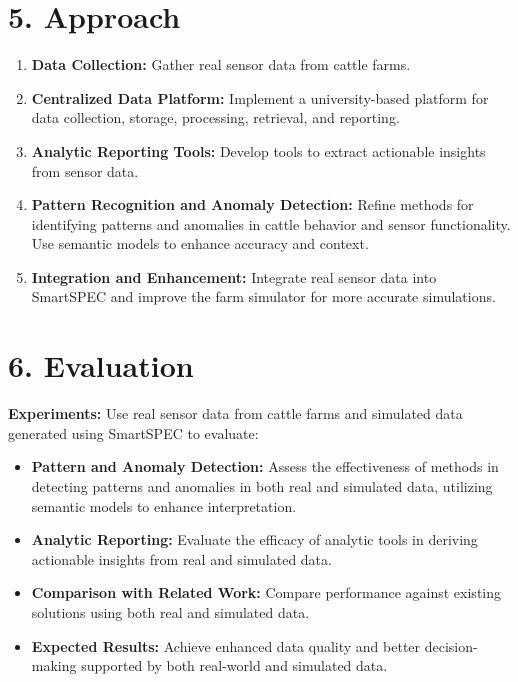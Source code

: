 \documentclass[11pt]{article}
\begin{document}
\section*{5. Approach}
\begin{enumerate}[label=\arabic*., wide=0pt, left=0pt]
    \item \textbf{Data Collection:} Gather real sensor data from cattle farms.
    \item \textbf{Centralized Data Platform:} Implement a university-based platform for data collection, storage, processing, retrieval, and reporting.
    \item \textbf{Analytic Reporting Tools:} Develop tools to extract actionable insights from sensor data.
    \item \textbf{Pattern Recognition and Anomaly Detection:} Refine methods for identifying patterns and anomalies in cattle behavior and sensor functionality. Use semantic models to enhance accuracy and context.
    \item \textbf{Integration and Enhancement:} Integrate real sensor data into SmartSPEC and improve the farm simulator for more accurate simulations.
\end{enumerate}

\section*{6. Evaluation}
\textbf{Experiments:} Use real sensor data from cattle farms and simulated data generated using SmartSPEC to evaluate:
\begin{itemize}
    \item \textbf{Pattern and Anomaly Detection:} Assess the effectiveness of methods in detecting patterns and anomalies in both real and simulated data, utilizing semantic models to enhance interpretation.
    \item \textbf{Analytic Reporting:} Evaluate the efficacy of analytic tools in deriving actionable insights from real and simulated data.
    \item \textbf{Comparison with Related Work:} Compare performance against existing solutions using both real and simulated data.
    \item \textbf{Expected Results:} Achieve enhanced data quality and better decision-making supported by both real-world and simulated data.
\end{itemize}
\end{document}
